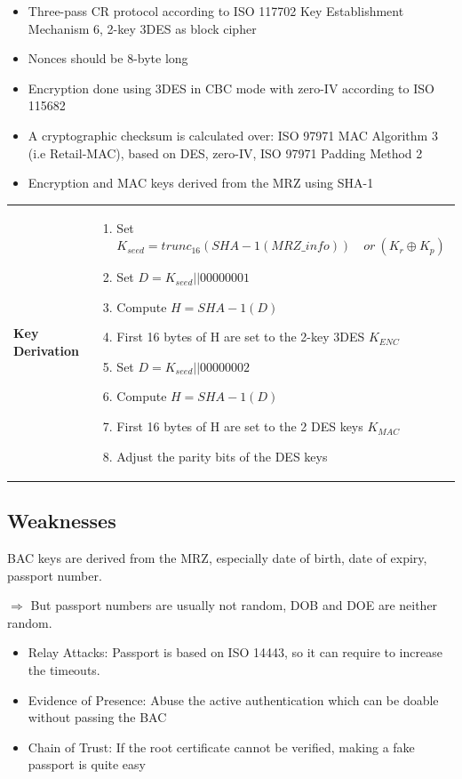 \begin{itemize}
    \item Three-pass CR protocol according to ISO 11770\text{-}2 Key Establishment
    Mechanism 6, 2-key 3DES as block cipher
    \item Nonces should be 8-byte long
    \item Encryption done using 3DES in CBC mode with zero-IV according to
    ISO 11568\text{-}2
    \item A cryptographic checksum is calculated over: ISO 9797\text{-}1 MAC
    Algorithm 3 (i.e Retail-MAC), based on DES, zero-IV, ISO 9797\text{-}1 Padding
    Method 2
    \item Encryption and MAC keys derived from the MRZ using SHA-1
\end{itemize}

\begin{tabular}{m{3cm}m{11cm}}
\textbf{Key Derivation} &
\begin{enumerate}
    \item Set $ K_{seed} = trunc_{16}(SHA-1(MRZ\_info))\quad or\ (K_r \oplus K_p)$
    \item Set $ D = K_{seed}||00000001 $
    \item Compute $ H = SHA-1(D) $
    \item First 16 bytes of H are set to the 2-key 3DES $ K_{ENC} $
    \item Set $ D = K_{seed}||00000002 $
    \item Compute $ H = SHA-1(D) $
    \item First 16 bytes of H are set to the 2 DES keys $K_{MAC} $
    \item Adjust the parity bits of the DES keys
\end{enumerate}
\end{tabular}

\subsection{Weaknesses}
BAC keys are derived from the MRZ, especially date of birth, date of expiry,
passport number. 

$\Rightarrow$ But passport numbers are usually not random, DOB and DOE are
neither random.

\begin{itemize}
    \item Relay Attacks: Passport is based on ISO 14443, so it can require to
    increase the timeouts.
    \item Evidence of Presence: Abuse the active authentication which can be
    doable without passing the BAC
    \item Chain of Trust: If the root certificate cannot be verified, making a
    fake passport is quite easy
\end{itemize}


